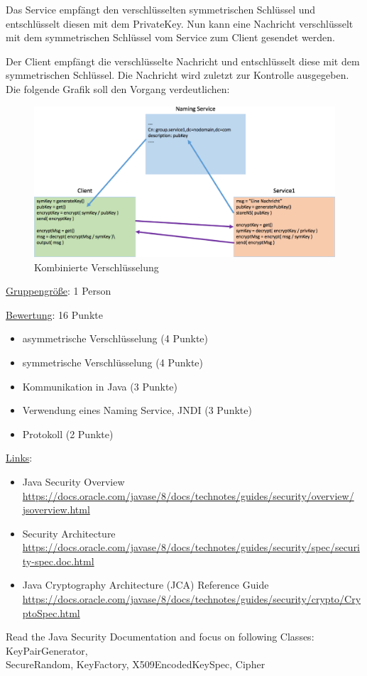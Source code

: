 Das Service empfängt den verschlüsselten symmetrischen Schlüssel und entschlüsselt diesen mit dem PrivateKey. Nun kann eine Nachricht verschlüsselt mit dem symmetrischen Schlüssel vom Service zum Client gesendet werden.

Der Client empfängt die verschlüsselte Nachricht und entschlüsselt diese mit dem symmetrischen Schlüssel. Die Nachricht wird zuletzt zur Kontrolle ausgegeben.
\clearpage
Die folgende Grafik soll den Vorgang verdeutlichen:
\begin{figure}[!h]
	\begin{center}
		\includegraphics[width=0.8\linewidth]{images/ablauf.png}
		\caption{Kombinierte Verschlüsselung}
		\label{ablauf}
	\end{center}
\end{figure}

\underline{Gruppengröße}: 1 Person

\underline{Bewertung}: 16 Punkte
\begin{itemize}
	\item asymmetrische Verschlüsselung (4 Punkte)
	\item symmetrische Verschlüsselung (4 Punkte)
	\item Kommunikation in Java (3 Punkte)
	\item Verwendung eines Naming Service, JNDI (3 Punkte)
	\item Protokoll (2 Punkte)
\end{itemize}

\underline{Links}:
\begin{itemize}
	\sloppy
	\item Java Security Overview\\
	\url{https://docs.oracle.com/javase/8/docs/technotes/guides/security/overview/ jsoverview.html}
	\item Security Architecture\\
	\url{https://docs.oracle.com/javase/8/docs/technotes/guides/security/spec/security-spec.doc.html}
	\item Java Cryptography Architecture (JCA) Reference Guide\\
	\url{https://docs.oracle.com/javase/8/docs/technotes/guides/security/crypto/CryptoSpec.html}
\end{itemize}

Read the Java Security Documentation and focus on following Classes: KeyPairGenerator, \\
SecureRandom, KeyFactory, X509EncodedKeySpec, Cipher
\clearpage
